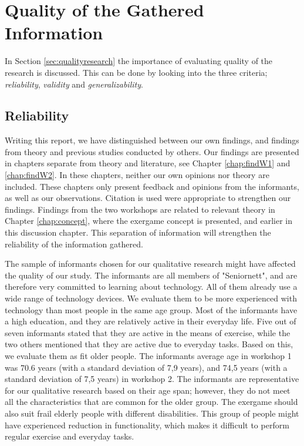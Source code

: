 \section{Quality of the Gathered Information}
\label{sec:qualityofresearch}

In Section \ref{sec:qualityresearch} the importance of evaluating quality of the research is discussed. This can be done by looking into the three criteria; \emph{reliability}, \emph{validity} and \emph{generalizability}.    

\subsection{Reliability}
Writing this report, we have distinguished between our own findings, and findings from theory and previous studies conducted by others. Our findings are presented in chapters separate from theory and literature, see Chapter \ref{chap:findW1} and \ref{chap:findW2}. In these chapters, neither our own opinions nor theory are included. These chapters only present feedback and opinions from the informants, as well as our observations. Citation is used were appropriate to strengthen our findings.  Findings from the two workshops are related to relevant theory in Chapter \ref{chap:concept}, where the exergame concept is presented, and earlier in this discussion chapter. This separation of information will strengthen the reliability of the information gathered.

The sample of informants chosen for our qualitative research might have affected the quality of our study. The informants are all members of "Seniornett", and are therefore very committed to learning about technology. All of them already use a wide range of technology devices. We evaluate them to be more experienced with technology than most people in the same age group. Most of the informants have a high education, and they are relatively active in their everyday life. Five out of seven informants stated that they are active in the means of exercise, while the two others mentioned that they are active due to everyday tasks. Based on this, we evaluate them as fit older people. The informants average age in workshop 1 was 70.6 years (with a standard deviation of 7,9 years), and 74,5 years (with a standard deviation of 7,5 years) in workshop 2. The informants are representative for our qualitative research based on their age span; however, they do not meet all the characteristics that are common for the older group. The exergame should also suit frail elderly people with different disabilities. This group of people might have experienced reduction in functionality, which makes it difficult to perform regular exercise and everyday tasks. 


